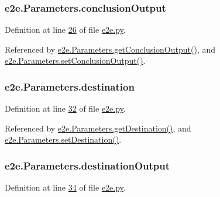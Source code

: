 \subsubsection[{\texorpdfstring{conclusion\+Output}{conclusionOutput}}]{\setlength{\rightskip}{0pt plus 5cm}e2e.\+Parameters.\+conclusion\+Output}\hypertarget{classe2e_1_1_parameters_ad5967b78ebf5c8778e423413053015a7}{}\label{classe2e_1_1_parameters_ad5967b78ebf5c8778e423413053015a7}


Definition at line \hyperlink{e2e_8py_source_l00026}{26} of file \hyperlink{e2e_8py_source}{e2e.\+py}.



Referenced by \hyperlink{e2e_8py_source_l00048}{e2e.\+Parameters.\+get\+Conclusion\+Output()}, and \hyperlink{e2e_8py_source_l00045}{e2e.\+Parameters.\+set\+Conclusion\+Output()}.

\subsubsection[{\texorpdfstring{destination}{destination}}]{\setlength{\rightskip}{0pt plus 5cm}e2e.\+Parameters.\+destination}\hypertarget{classe2e_1_1_parameters_ad2cdf746b8890c53a9cab6fd7df7043b}{}\label{classe2e_1_1_parameters_ad2cdf746b8890c53a9cab6fd7df7043b}


Definition at line \hyperlink{e2e_8py_source_l00032}{32} of file \hyperlink{e2e_8py_source}{e2e.\+py}.



Referenced by \hyperlink{e2e_8py_source_l00084}{e2e.\+Parameters.\+get\+Destination()}, and \hyperlink{e2e_8py_source_l00081}{e2e.\+Parameters.\+set\+Destination()}.

\subsubsection[{\texorpdfstring{destination\+Output}{destinationOutput}}]{\setlength{\rightskip}{0pt plus 5cm}e2e.\+Parameters.\+destination\+Output}\hypertarget{classe2e_1_1_parameters_a3b4ae5aa9b73466e51018b6f37792577}{}\label{classe2e_1_1_parameters_a3b4ae5aa9b73466e51018b6f37792577}


Definition at line \hyperlink{e2e_8py_source_l00034}{34} of file \hyperlink{e2e_8py_source}{e2e.\+py}.



